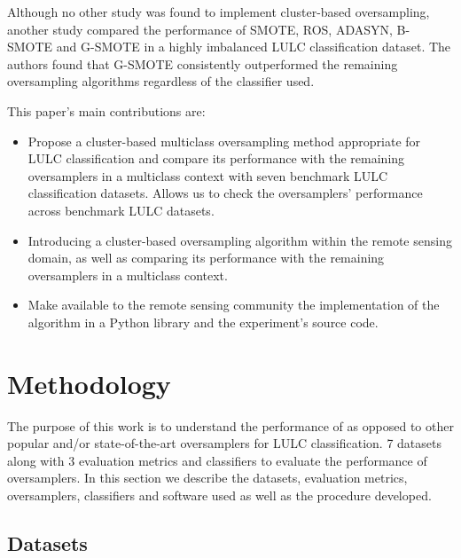 \documentclass[remotesensing,article,submit,moreauthors,pdftex]{Definitions/mdpi}
\begin{document}
\begin{paracol}{2}
\linenumbers
\switchcolumn

Although no other study was found to implement cluster-based oversampling,
another study \cite{Douzas2019rs} compared the performance of SMOTE, ROS,
ADASYN, B-SMOTE and G-SMOTE in a highly imbalanced LULC classification dataset.
The authors found that G-SMOTE consistently outperformed the remaining
oversampling algorithms regardless of the classifier used.

This paper's main contributions are:
\begin{itemize}
    \item Propose a cluster-based multiclass oversampling method appropriate
        for LULC classification and compare its performance with the remaining
        oversamplers in a multiclass context with seven benchmark LULC
        classification datasets. Allows us to check the oversamplers'
        performance across benchmark LULC datasets.
    \item Introducing a cluster-based oversampling algorithm within the remote
        sensing domain, as well as comparing its performance with the remaining
        oversamplers in a multiclass context.
    \item Make available to the remote sensing community the implementation
        of the algorithm in a Python library and the experiment's source code.
\end{itemize}

\section{Methodology}\label{sec:methodology}

The purpose of this work is to understand the performance of  as opposed to other popular and/or state-of-the-art
oversamplers for LULC classification.  7  datasets  along with 3 evaluation metrics and  classifiers
to evaluate the performance of oversamplers. In this section we describe the
datasets, evaluation metrics, oversamplers, classifiers and software used as
well as the procedure developed.

\subsection{Datasets}


\end{paracol}
\end{document}
